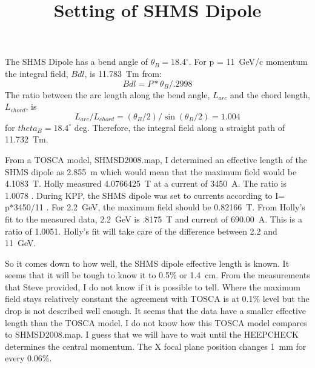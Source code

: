 \documentclass[]{article}
\title{Setting of SHMS Dipole}
\begin{document}
\maketitle

The SHMS Dipole has a bend angle of $\theta_B = 18.4^{\circ}$. For p = 11~GeV/c momentum
the integral field, $Bdl$,  is 11.783~Tm from:
\begin{equation}
     Bdl =  P*\theta_{B}/.2998
\end{equation}
The ratio between the arc length along the bend angle, $L_{arc}$ and the chord length, $L_{chord}$, is 
	\begin{equation}
	L_{arc}/L_{chord} = (\theta_{B}/2)/\sin(\theta_{B}/2)=1.004
	\end{equation}
	for $theta_B = 18.4^{\circ}$ deg. Therefore, the integral field along a straight path of 11.732~Tm.
	
From a TOSCA model, SHMSD2008.map, I determined an effective length of the SHMS dipole as 2.855~m which
would mean that the maximum field would be 4.1083~T. Holly measured 4.0766425~T at a current of 3450~A.
The ratio is 1.0078 . 
During KPP, the SHMS dipole was set to currents according to I= p*3450/11 . 
For 2.2~GeV, the maximum field should be 0.82166~T. From Holly's fit to the measured
data, 2.2~GeV is .8175~T and current of 690.00~A. This is a ratio of 1.0051. Holly's
fit will take care of the  difference between 2.2 and 11~GeV.

So it comes down to how well, the SHMS dipole effective length is known. 
It seems that it will be tough to know it to 0.5\% or 1.4~cm. From the measurements
that Steve provided, I do not know if it is possible to tell. Where the
maximum field stays relatively constant the agreement with TOSCA is at 0.1\%
level but the drop is not described well enough. It seems that the data have a smaller
effective length than the TOSCA model. I do not know how this TOSCA model compares to
SHMSD2008.map. I guess that we will have to wait until the HEEPCHECK determines the
central momentum. The X focal plane position changes 1~mm for every 0.06\%.

	
\end{document}
